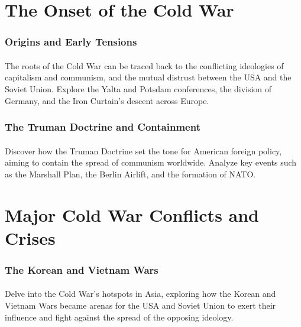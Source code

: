 \documentclass[a4paper,12pt]{book}
\begin{document}
\section*{The Onset of the Cold War}
\paragraph{}
\subsubsection*{Origins and Early Tensions}
\paragraph{}
The roots of the Cold War can be traced back to the conflicting ideologies of capitalism and communism, and the mutual distrust between the USA and the Soviet Union. Explore the Yalta and Potsdam conferences, the division of Germany, and the Iron Curtain’s descent across Europe.

\subsubsection*{The Truman Doctrine and Containment}
\paragraph{}
Discover how the Truman Doctrine set the tone for American foreign policy, aiming to contain the spread of communism worldwide. Analyze key events such as the Marshall Plan, the Berlin Airlift, and the formation of NATO.

\section*{Major Cold War Conflicts and Crises}
\paragraph{}
\subsubsection*{The Korean and Vietnam Wars}
\paragraph{}
Delve into the Cold War’s hotspots in Asia, exploring how the Korean and Vietnam Wars became arenas for the USA and Soviet Union to exert their influence and fight against the spread of the opposing ideology.
\end{document}
